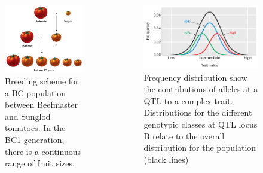 \documentclass[11pt,dvipsnames,ignorenonframetext,aspectratio=169]{beamer}
\newcommand{\bcolumns}{\begin{columns}[T, onlytextwidth]}
\newcommand{\ecolumns}{\end{columns}}
\begin{document}
\begin{frame}{}
\protect\hypertarget{section-6}{}
\bcolumns
{}

\begin{figure}
\includegraphics[width=0.72\linewidth]{../images/tomato-beefmaster-sungold-cross} \caption{Breeding scheme for a BC population between Beefmaster and Sunglod tomatoes. In the BC1 generation, there is a continuous range of fruit sizes.}\label{fig:tomato-beefmaster-sungold-cross}
\end{figure}


\begin{figure}
\includegraphics[width=0.92\linewidth]{../images/frequency_distribution_showing_contribution_qtl} \caption{Frequency distribution show the contributions of alleles at a QTL to a complex trait. Distributions for the different genotypic classes at QTL locus B relate to the overall distribution for the population (black lines)}\label{fig:allele-freq-distribution}
\end{figure}

\ecolumns
\end{frame}
\end{document}
